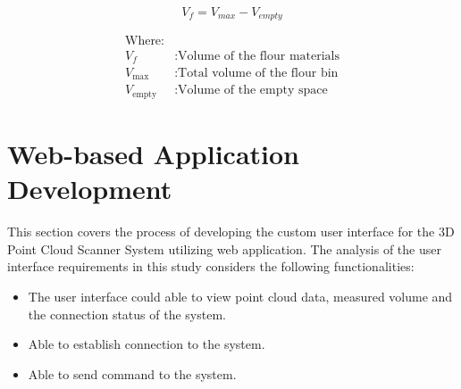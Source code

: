 \begin{equation}
	\label{ch4:eq:volume}
	V_f = V_{max} - V_{empty}
\end{equation}

\begin{align*}
	 & \text{Where:}    &                                          \\
	 & V_f              & : \text{Volume of the flour materials}   \\
	 & V_{\text{max}}   & : \text{Total volume of the flour bin}   \\
	 & V_{\text{empty}} & : \text{Volume of the empty space}     &
\end{align*}





\section{Web-based Application Development}
This section covers the process of developing the custom user interface for the 3D Point Cloud Scanner System utilizing web application. The analysis of the user interface requirements in this study considers the following functionalities:
\begin{itemize}
	\item The user interface could able to view point cloud data, measured volume and the connection status of the system.
	\item Able to establish connection to the system.
	\item Able to send command to the system.
\end{itemize}

